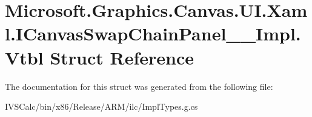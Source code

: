 \hypertarget{struct_microsoft_1_1_graphics_1_1_canvas_1_1_u_i_1_1_xaml_1_1_i_canvas_swap_chain_panel_____impl_1_1_vtbl}{}\section{Microsoft.\+Graphics.\+Canvas.\+U\+I.\+Xaml.\+I\+Canvas\+Swap\+Chain\+Panel\+\_\+\+\_\+\+Impl.\+Vtbl Struct Reference}
\label{struct_microsoft_1_1_graphics_1_1_canvas_1_1_u_i_1_1_xaml_1_1_i_canvas_swap_chain_panel_____impl_1_1_vtbl}


The documentation for this struct was generated from the following file\+:\begin{DoxyCompactItemize}
\item 
I\+V\+S\+Calc/bin/x86/\+Release/\+A\+R\+M/ilc/Impl\+Types.\+g.\+cs\end{DoxyCompactItemize}
